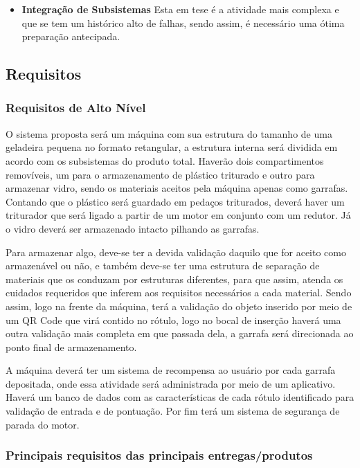 \begin{apendicesenv}
\begin{itemize}
    \item \textbf{Integração de Subsistemas}
        Esta em tese é a atividade mais complexa e que se tem um histórico alto de falhas, sendo assim, é necessário uma ótima preparação antecipada.
\end{itemize}

\subsection{Requisitos}
\subsubsection{Requisitos de Alto Nível}
O sistema proposta será um máquina com sua estrutura do tamanho de uma geladeira pequena no formato retangular, a estrutura interna será dividida em acordo com os subsistemas do produto total. Haverão dois compartimentos removíveis, um para o armazenamento de plástico triturado e outro para armazenar vidro, sendo os materiais aceitos pela máquina apenas como garrafas. Contando que o plástico será guardado em pedaços triturados, deverá haver um triturador que será ligado a partir de um motor em conjunto com um redutor. Já o vidro deverá ser armazenado intacto pilhando as garrafas.

Para armazenar algo, deve-se ter a devida validação daquilo que for aceito como armazenável ou não, e também deve-se ter uma estrutura de separação de materiais que os conduzam por estruturas diferentes, para que assim, atenda os cuidados requeridos que inferem aos requisitos necessários a cada material. Sendo assim, logo na frente da máquina, terá a validação do objeto inserido por meio de um QR Code que virá contido no rótulo, logo no bocal de inserção haverá uma outra validação mais completa em que passada dela, a garrafa será direcionada ao ponto final de armazenamento.

A máquina deverá ter um sistema de recompensa ao usuário por cada garrafa depositada, onde essa atividade será administrada por meio de um aplicativo. Haverá um banco de dados com as características de cada rótulo identificado para validação de entrada e de pontuação. Por fim terá um sistema de segurança de parada do motor.

\subsubsection{Principais requisitos das principais entregas/produtos}


\end{apendicesenv}
